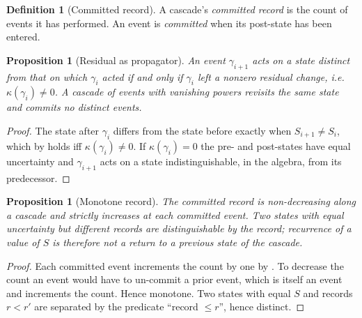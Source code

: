 \documentclass[11pt,a4paper]{article}
\theoremstyle{thmstyle}
\newtheorem{proposition}[theorem]{Proposition}
\theoremstyle{definition}
\newtheorem{definition}[theorem]{Definition}
\theoremstyle{remark}
\newcommand{\kap}{\kappa}
\begin{document}
\begin{definition}[Committed record]
\label{def:record}
A cascade's \emph{committed record} is the count of events it has performed.
An event is \emph{committed} when its post-state has been entered.
\end{definition}

\begin{proposition}[Residual as propagator]
\label{prop:propagator}
An event $\gamma_{i+1}$ acts on a state distinct from that on which
$\gamma_i$ acted if and only if $\gamma_i$ left a nonzero residual change,
i.e.\ $\kap(\gamma_i)\ne0$. A cascade of events with vanishing powers
revisits the same state and commits no distinct events.
\end{proposition}

\begin{proof}
The state after $\gamma_i$ differs from the state before exactly when
$S_{i+1}\ne S_i$, which by  holds iff $\kap(\gamma_i)\ne0$.
If $\kap(\gamma_i)=0$ the pre- and post-states have equal uncertainty and
$\gamma_{i+1}$ acts on a state indistinguishable, in the algebra, from its
predecessor.
\end{proof}

\begin{proposition}[Monotone record]
\label{prop:monotone}
The committed record is non-decreasing along a cascade and strictly
increases at each committed event. Two states with equal uncertainty but
different records are distinguishable by the record; recurrence of a value
of $S$ is therefore not a return to a previous state of the cascade.
\end{proposition}

\begin{proof}
Each committed event increments the count by one by . To
decrease the count an event would have to un-commit a prior event, which is
itself an event and increments the count. Hence monotone. Two states with
equal $S$ and records $r<r'$ are separated by the predicate ``record
$\le r$'', hence distinct.
\end{proof}
\end{document}
